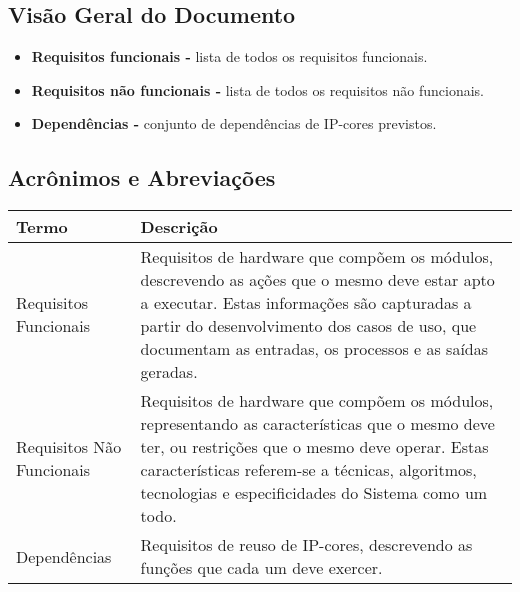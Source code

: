 \documentclass{article}
\begin{document}
\subsection{Visão Geral do Documento}
  \begin{itemize}
   \item \textbf{Requisitos funcionais -} lista de todos os requisitos funcionais.
   \item \textbf{Requisitos não funcionais -} lista de todos os requisitos não funcionais.
   \item \textbf{Dependências -} conjunto de dependências de IP-cores previstos.
  \end{itemize}

  \subsection{Acrônimos e Abreviações}
  
  \FloatBarrier
  \begin{table}[H]
    \begin{center}
      \begin{tabular}[pos]{|m{5cm} | m{9cm}|} 
        \hline
        \cellcolor[gray]{0.9}\textbf{Termo} & \cellcolor[gray]{0.9}\textbf{Descrição} \\ \hline
        Requisitos Funcionais     & Requisitos de hardware que compõem os módulos, descrevendo as ações que o 
                                    mesmo deve estar apto a executar. Estas informações são capturadas a partir 
                                    do desenvolvimento dos casos de uso, que documentam as entradas, os processos 
                                    e as saídas geradas.  \\ \hline
        Requisitos Não Funcionais & Requisitos de hardware que compõem os módulos, representando as características 
                                    que o mesmo deve ter, ou restrições que o mesmo deve operar. Estas características
                                    referem-se a técnicas, algoritmos, tecnologias e especificidades do Sistema como um todo.  \\ \hline
        Dependências              & Requisitos de reuso de IP-cores, descrevendo as funções que cada um deve exercer. \\ \hline
      \end{tabular}
    \end{center}
  \end{table}  
\end{document}
